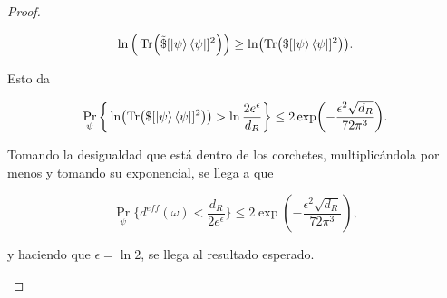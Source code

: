 \begin{proof}
\begin{enumerate}
\begin{equation}
\ln\Big( \Tr (\tilde{\$}[\ket{\psi}\bra{\psi}]^{2}) \Big) \geq \ln ( \Tr ( \$ [\ket{\psi}\bra{\psi}]^{2}) ).
\end{equation}

Esto da 

\begin{equation}
\Pr_{\psi}  \bigg \{ \ln (\Tr ( \$ [\ket{\psi}\bra{\psi}]^{2})) > \ln\frac{2e^{\epsilon}}{d_{R}} \bigg \} \leq 2 \exp (-\frac{\epsilon^{2} \sqrt{d_{R}}}{72 \pi^{3}}).
\end{equation}

Tomando la desigualdad que está dentro de los corchetes, multiplicándola por menos y tomando su exponencial, se llega a que

\begin{equation}
\Pr_{\psi} \bigg \{  d^{eff}(\omega) < \frac{d_{R}}{2e^{\epsilon}} \bigg \} \leq 2\exp(-\frac{\epsilon^{2}\sqrt{d_{R}}}{72\pi^{3}}),
\end{equation}

y haciendo que $\epsilon=\ln 2$, se llega al resultado esperado.
\\
\end{enumerate}
\end{proof}

